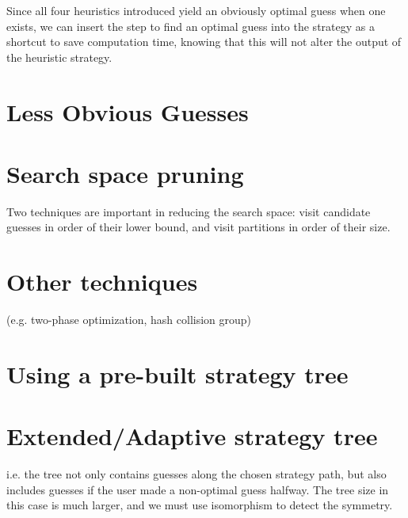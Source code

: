Since all four heuristics introduced yield an obviously optimal guess when one exists, we can insert the step to find an optimal guess into the strategy as a shortcut to save computation time, knowing that this will not alter the output of the heuristic strategy.

\section{Less Obvious Guesses}



\section{Search space pruning}

Two techniques are important in reducing the search space: visit candidate guesses in order of their lower bound, and visit partitions in order of their size.

\section{Other techniques}

(e.g. two-phase optimization, hash collision group)

\section{Using a pre-built strategy tree}

\section{Extended/Adaptive strategy tree}

i.e. the tree not only contains guesses along the chosen strategy path, but also includes guesses if the user made a non-optimal guess halfway. The tree size in this case is much larger, and we must use isomorphism to detect the symmetry.

 
